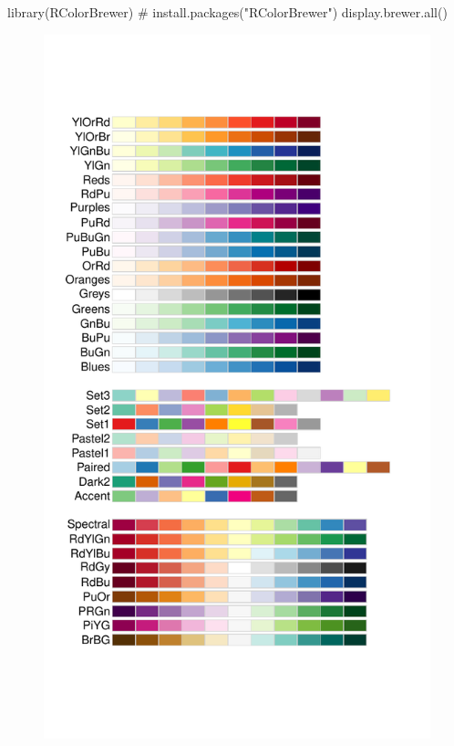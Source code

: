 \documentclass[
  letterpaper,
]{book}
\newenvironment{Shaded}{\begin{snugshade}}{\end{snugshade}}
\newcommand{\CommentTok}[1]{\textcolor[rgb]{0.37,0.37,0.37}{#1}}
\newcommand{\FunctionTok}[1]{\textcolor[rgb]{0.28,0.35,0.67}{#1}}
\newcommand{\NormalTok}[1]{\textcolor[rgb]{0.00,0.23,0.31}{#1}}
\begin{document}
\begin{Shaded}
\begin{Highlighting}[]
\FunctionTok{library}\NormalTok{(RColorBrewer) }\CommentTok{\# install.packages("RColorBrewer")}
\FunctionTok{display.brewer.all}\NormalTok{()}
\end{Highlighting}
\end{Shaded}

\begin{figure}[H]

{\centering \includegraphics{colors_files/figure-pdf/dataviz-brewer-1.pdf}

}

\end{figure}
\end{document}
